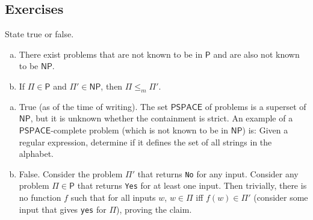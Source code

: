 \subsection{Exercises}
	
	\begin{exercise}
		State true or false.
		\begin{enumerate}[(a)]
			\item There exist problems that are not known to be in $\mathsf{P}$ and are also not known to be $\mathsf{NP}$.
			\item If $\mathsf{\Pi}\in\mathsf{P}$ and $\mathsf{\Pi}'\in\mathsf{NP}$, then $\mathsf{\Pi}\leq_m\mathsf{\Pi}'$.
		\end{enumerate}
	\end{exercise}
	\begin{solution*}
		\begin{enumerate}[(a)]
			\item True (as of the time of writing). The set \href{https://en.wikipedia.org/wiki/PSPACE}{$\mathsf{PSPACE}$} of problems is a superset of $\mathsf{NP}$, but it is unknown whether the containment is strict. An example of a $\mathsf{PSPACE}$-complete problem (which is not known to be in $\mathsf{NP}$) is: Given a regular expression, determine if it defines the set of all strings in the alphabet.


			\item False. Consider the problem $\mathsf{\Pi}'$ that returns \texttt{No} for any input. Consider any problem $\mathsf{\Pi}\in\mathsf{P}$ that returns \texttt{Yes} for at least one input. Then trivially, there is no function $f$ such that for all inputs $w$, $w\in\mathsf{\Pi}$ iff $f(w)\in\mathsf{\Pi}'$ (consider some input that gives \texttt{yes} for $\mathsf{\Pi}$), proving the claim.
		\end{enumerate}
	\end{solution*}